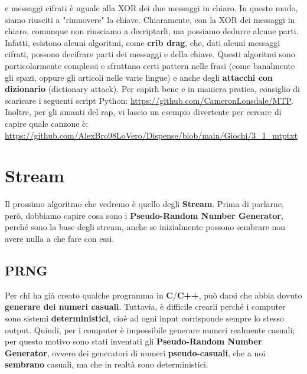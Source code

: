 \documentclass{rapport}
\begin{document}
e messaggi cifrati è uguale alla XOR dei due messaggi in chiaro. In questo modo, siamo riusciti a "rimuovere" la chiave. Chiaramente, con la XOR dei messaggi in chiaro, comunque non riusciamo a decriptarli, ma possiamo dedurre alcune parti. Infatti, esistono alcuni algoritmi, come \textbf{crib drag}, che, dati alcuni messaggi cifrati, possono decifrare parti dei messaggi e della chiave. Questi algoritmi sono particolarmente complessi e sfruttano certi pattern nelle frasi (come banalmente gli spazi, oppure gli articoli nelle varie lingue) e anche degli \textbf{attacchi con dizionario} (dictionary attack). Per capirli bene e in maniera pratica, consiglio di scaricare i seguenti script Python: \textcolor{maincolor}{\url{https://github.com/CameronLonsdale/MTP}}. Inoltre, per gli amanti del rap, vi lascio un esempio divertente per cercare di capire quale canzone è: \textcolor{maincolor}{\url{https://github.com/AlexBro98LoVero/Dispense/blob/main/Giochi/3_1_mtptxt}}













\newpage

\section{Stream}

Il prossimo algoritmo che vedremo è quello degli \textbf{Stream}.  
Prima di parlarne, però, dobbiamo capire cosa sono i \textbf{Pseudo-Random Number Generator}, perché sono la base degli stream, anche se inizialmente possono sembrare non avere nulla a che fare con essi.

\subsection{PRNG}

Per chi ha già creato qualche programma in \textbf{C}/\textbf{C++}, può darsi che abbia dovuto \textbf{generare dei numeri casuali}.  
Tuttavia, è difficile crearli perché i computer sono sistemi \textbf{deterministici}, cioè ad ogni input corrisponde sempre lo stesso output.  
Quindi, per i computer è impossibile generare numeri realmente casuali; per questo motivo sono stati inventati gli \textbf{Pseudo-Random Number Generator}, ovvero dei generatori di numeri \textbf{pseudo-casuali}, che a noi \textbf{sembrano} casuali, ma che in realtà sono deterministici.
\end{document}
